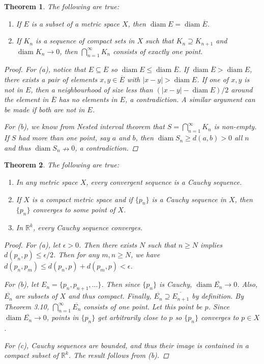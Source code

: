 \documentclass{scrbook}
\newcommand{\R}{\mathbb{R}}
\renewcommand{\to}{\rightarrow}
\newcommand{\nto}{\nrightarrow}
\DeclareMathOperator{\diam}{diam}
\newtheorem{theorem}{Theorem}
\begin{document}
\begin{theorem} %
The following are true:
\begin{enumerate}
\item If $E$ is a subset of a metric space $X$, then $\diam E = \diam \overline{E}$. 

\item If $K_n$ is a sequence of compact sets in $X$ such that $K_n \supseteq K_{n+1}$ and $\diam K_n \to 0$, then $\bigcap_{n=1}^{\infty} K_n$ consists of exactly one point.
\end{enumerate}

\begin{proof}
For (a), notice that $E \subseteq \overline{E}$ so $\diam E \le \diam \overline{E}$. If $\diam \overline{E} > \diam E$, there exists a pair of elements $x, y \in \overline{E}$ with $|x - y| > \diam E$. If one of $x, y$ is not in $E$, then a neighbourhood of size less than $(|x - y| - \diam E)/2$ around the element in $\overline{E}$ has no elements in $E$, a contradiction. A similar argument can be made if both are not in $E$. 

For (b), we know from Nested interval theorem that $S = \bigcap_{n=1}^{\infty} K_n$ is non-empty. If $S$ had more than one point, say $a$ and $b$, then $\diam S_n \ge d(a, b) > 0$ all $n$ and thus $\diam S_n \nto 0$, a contradiction.
\end{proof}
\end{theorem}

\begin{theorem} %
The following are true:
\begin{enumerate}
\item In any metric space $X$, every convergent sequence is a Cauchy sequence.

\item If $X$ is a compact metric space and if $\{p_n\}$ is a Cauchy sequence in $X$, then $\{p_n\}$ converges to some point of $X$.

\item In $\R^k$, every Cauchy sequence converges.
\end{enumerate}

\begin{proof}
For (a), let $\epsilon > 0$. Then there exists $N$ such that $n \ge N$ implies $d(p_n, p) \le \epsilon/2$. Then for any $m, n \ge N$, we have $d(p_n, p_m) \le d(p_n, p) + d(p_m, p) < \epsilon$. 

For (b), let $E_n = \{p_n, p_{n+1}, \dotsc\}$. Then since $\{p_n\}$ is Cauchy, $\diam \overline{E_n} \to 0$. Also, $\overline{E_n}$ are subsets of $X$ and thus compact. Finally, $\overline{E_n} \supseteq \overline{E_{n+1}}$ by definition. By Theorem 3.10, $\bigcap_{n=1}^{\infty} \overline{E_n}$ consists of one point. Let this point be $p$. Since $\diam \overline{E_n} \to 0$, points in $\{p_n\}$ get arbitrarily close to $p$ so $\{p_n\}$ converges to $p \in X$.

For (c), Cauchy sequences are bounded, and thus their image is contained in a compact subset of $\R^k$. The result follows from (b).
\end{proof}
\end{theorem}
\end{document}
